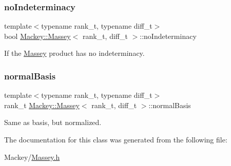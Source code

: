\subsubsection{\texorpdfstring{no\+Indeterminacy}{noIndeterminacy}}
{\footnotesize\ttfamily template$<$typename rank\+\_\+t, typename diff\+\_\+t$>$ \\
bool \hyperlink{classMackey_1_1Massey}{Mackey\+::\+Massey}$<$ rank\+\_\+t, diff\+\_\+t $>$\+::no\+Indeterminacy}



If the \hyperlink{classMackey_1_1Massey}{Massey} product has no indeterminacy. 

\mbox{\label{classMackey_1_1Massey_a36e3aa9de7d7617feb243d886c5936c8}} 
\subsubsection{\texorpdfstring{normal\+Basis}{normalBasis}}
{\footnotesize\ttfamily template$<$typename rank\+\_\+t, typename diff\+\_\+t$>$ \\
rank\+\_\+t \hyperlink{classMackey_1_1Massey}{Mackey\+::\+Massey}$<$ rank\+\_\+t, diff\+\_\+t $>$\+::normal\+Basis}



Same as basis, but normalized. 



The documentation for this class was generated from the following file\+:\begin{DoxyCompactItemize}
\item 
Mackey/\hyperlink{Massey_8h}{Massey.\+h}\end{DoxyCompactItemize}

